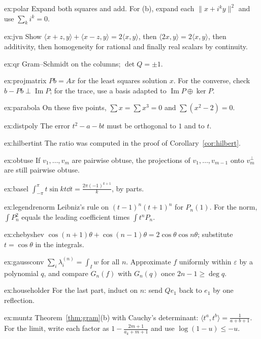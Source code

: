 \begin{hint}{ex:polar}
Expand both squares and add. For (b), expand each $\|x+i^ky\|^2$ and use $\sum_ki^k=0$.
\end{hint}
\begin{hint}{ex:jvn}
Show $\langle x+z,y\rangle+\langle x-z,y\rangle=2\langle x,y\rangle$, then $\langle2x,y\rangle=2\langle x,y\rangle$, then
additivity, then homogeneity for rational and finally real scalars by continuity.
\end{hint}
\begin{hint}{ex:qr}
Gram--Schmidt on the columns; $\det Q=\pm1$.
\end{hint}
\begin{hint}{ex:projmatrix}
$Pb=Ax$ for the least squares solution $x$. For the converse, check $b-Pb\perp\operatorname{Im}P$; for the trace, use a basis
adapted to $\operatorname{Im}P\oplus\ker P$.
\end{hint}
\begin{hint}{ex:parabola}
On these five points, $\sum x=\sum x^3=0$ and $\sum(x^2-2)=0$.
\end{hint}
\begin{hint}{ex:distpoly}
The error $t^2-a-bt$ must be orthogonal to $1$ and to $t$.
\end{hint}
\begin{hint}{ex:hilbertint}
The ratio was computed in the proof of Corollary~\ref{cor:hilbert}.
\end{hint}
\begin{hint}{ex:obtuse}
If $v_1,\dots,v_m$ are pairwise obtuse, the projections of $v_1,\dots,v_{m-1}$ onto $v_m^\perp$ are still pairwise obtuse.
\end{hint}
\begin{hint}{ex:basel}
$\int_{-\pi}^\pi t\sin kt\dd t=\frac{2\pi(-1)^{k+1}}k$, by parts.
\end{hint}
\begin{hint}{ex:legendrenorm}
Leibniz's rule on $(t-1)^n(t+1)^n$ for $P_n(1)$. For the norm, $\int P_n^2$ equals the leading coefficient times
$\int t^nP_n$.
\end{hint}
\begin{hint}{ex:chebyshev}
$\cos(n+1)\theta+\cos(n-1)\theta=2\cos\theta\cos n\theta$; substitute $t=\cos\theta$ in the integrals.
\end{hint}
\begin{hint}{ex:gaussconv}
$\sum_i\lambda_i^{(n)}=\int_Iw$ for all $n$. Approximate $f$ uniformly within $\varepsilon$ by a polynomial $q$, and compare
$G_n(f)$ with $G_n(q)$ once $2n-1\ge\deg q$.
\end{hint}
\begin{hint}{ex:householder}
For the last part, induct on $n$: send $Qe_1$ back to $e_1$ by one reflection.
\end{hint}
\begin{hint}{ex:muntz}
Theorem~\ref{thm:gram}(b) with Cauchy's determinant: $\langle t^a,t^b\rangle=\frac1{a+b+1}$. For the limit, write each factor
as $1-\frac{2m+1}{a_k+m+1}$ and use $\log(1-u)\le-u$.
\end{hint}

